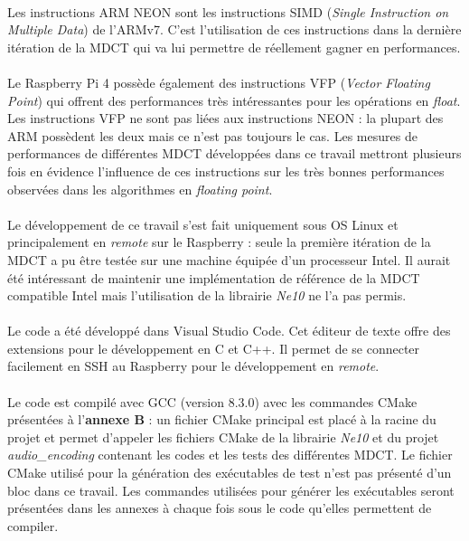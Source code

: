 \documentclass{article}
\begin{document}
    \paragraph{}
    Les instructions ARM NEON sont les instructions SIMD (\emph{Single Instruction on Multiple Data}) de l'ARMv7. C'est l'utilisation de ces instructions dans la dernière itération de la MDCT qui va lui permettre de réellement gagner en performances.

    \paragraph{}
    Le Raspberry Pi 4 possède également des instructions VFP (\emph{Vector Floating Point}) qui offrent des performances très intéressantes pour les opérations en \emph{float}. Les instructions VFP ne sont pas liées aux instructions NEON : la plupart des ARM possèdent les deux mais ce n'est pas toujours le cas. Les mesures de performances de différentes MDCT développées dans ce travail mettront plusieurs fois en évidence l'influence de ces instructions sur les très bonnes performances observées dans les algorithmes en \emph{floating point}.

    \paragraph{}
    Le développement de ce travail s'est fait uniquement sous OS Linux et principalement en \emph{remote} sur le Raspberry : seule la première itération de la MDCT a pu être testée sur une machine équipée d'un processeur Intel. Il aurait été intéressant de maintenir une implémentation de référence de la MDCT compatible Intel mais l'utilisation de la librairie \emph{Ne10} ne l'a pas permis.

    \paragraph{}
    Le code a été développé dans Visual Studio Code. Cet éditeur de texte offre des extensions pour le développement en C et C++. Il permet de se connecter facilement en SSH au Raspberry pour le développement en \emph{remote}.

    \paragraph{}
    Le code est compilé avec GCC (version 8.3.0) avec les commandes CMake présentées à l'\textbf{annexe B} : un fichier CMake principal est placé à la racine du projet et permet d'appeler les fichiers CMake de la librairie \emph{Ne10} et du projet \emph{audio\_encoding} contenant les codes et les tests des différentes MDCT. Le fichier CMake utilisé pour la génération des exécutables de test n'est pas présenté d'un bloc dans ce travail. Les commandes utilisées pour générer les exécutables seront présentées dans les annexes à chaque fois sous le code qu'elles permettent de compiler.
\end{document}
